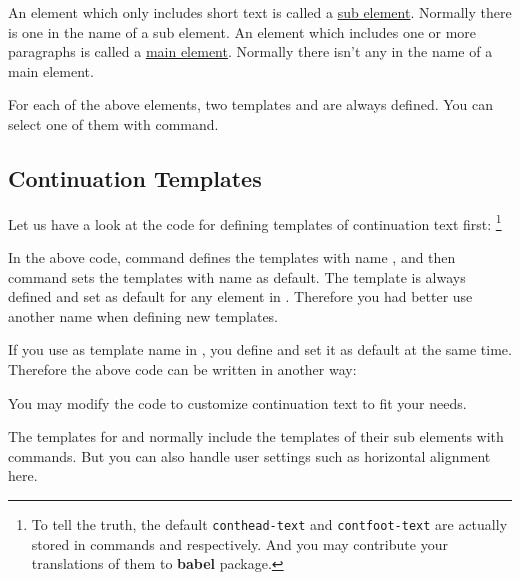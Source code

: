 \documentclass[oneside]{book}
\begin{document}
An element which only includes short text is called a \underline{sub element}.
Normally there is one \TT{-} in the name of a sub element.
An element which includes one or more paragraphs is called a \underline{main element}.
Normally there isn't any \TT{-} in the name of a main element.

For each of the above elements, two templates  and  are always defined.
You can select one of them with \CC{\SetTblrTemplate} command.

\subsection{Continuation Templates}

Let us have a look at the code for defining templates of continuation text first:%
\footnote{To tell the truth, the default \texttt{conthead-text} and \texttt{contfoot-text}
are actually stored in commands \texttt{\string\tblrcontheadname} and \texttt{\string\tblrcontfootname}
respectively. And you may contribute your translations of them to \textbf{babel} package.}

\begin{codehigh}
\end{codehigh}

In the above code, command \CC{\DeclareTblrTemplate} defines the templates with name ,
and then command \CC{\SetTblrTemplate} sets the templates with name  as default.
The  template is always defined and set as default for any element in .
Therefore you had better use another name when defining new templates.

If you use  as template name in \CC{\DeclareTblrTemplate},
you define and set it as default at the same time.
Therefore the above code can be written in another way:

\begin{codehigh}
\end{codehigh}

You may modify the code to customize continuation text to fit your needs.

The templates for  and  normally
include the templates of their sub elements with \CC{\UseTblrTemplate} commands.
But you can also handle user settings such as horizontal alignment here.
\end{document}
